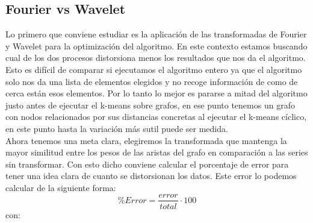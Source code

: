 \documentclass[12pt,a4paper]{article}
\begin{document}
		\subsection{Fourier vs Wavelet}
		Lo primero que conviene estudiar es la aplicación de las transformadas de Fourier y Wavelet para la optimización del algoritmo. En este contexto estamos buscando cual de los dos procesos distorsiona menos los resultados que nos da el algoritmo. Esto es difícil de comparar si ejecutamos el algoritmo entero ya que el algoritmo solo nos da una lista de elementos elegidos y no recoge información de como de cerca están esos elementos. Por lo tanto lo mejor es pararse a mitad del algoritmo justo antes de ejecutar el k-means sobre grafos, en ese punto tenemos un grafo con nodos relacionados por sus distancias concretas al ejecutar el k-means cíclico, en este punto hasta la variación más sutil puede ser medida.\\
		Ahora tenemos una meta clara, elegiremos la transformada que mantenga la mayor similitud entre los pesos de las aristas del grafo en comparación a las series sin transformar. Con esto dicho conviene calcular el porcentaje de error para tener una idea clara de cuanto se distorsionan los datos. Este error lo podemos calcular de la siguiente forma: \\
		\[ \%Error = \frac{error}{total} · 100\]
		con:\\
		
\end{document}
